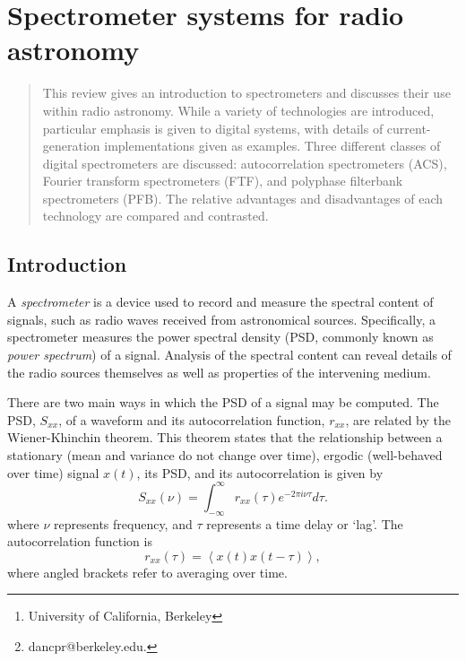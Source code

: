 \documentclass{ws-rv961x669}
\begin{document}
\chapter[Spectrometers]{Spectrometer systems for radio astronomy}\label{spec_chap}

\author[D. Price, J. Hickish and D. Werthimer]{Danny C. Price\footnote{dancpr@berkeley.edu.}, Jack Hickish and Dan Werthimer}

\address{Campbell Hall 339, UC Berkeley\\
Address goes here, \\
dancpr@berkeley.edu\footnote{University of California, Berkeley}}

\begin{abstract}
This review gives an introduction to spectrometers and discusses their use within radio astronomy. While a variety of technologies are introduced, particular emphasis is given to digital systems, with details of current-generation implementations given as examples. Three different classes of digital spectrometers are discussed: autocorrelation spectrometers (ACS), Fourier transform spectrometers (FTF), and polyphase filterbank spectrometers (PFB). The relative advantages and disadvantages of each technology are compared and contrasted. 

\end{abstract}


\body

\section{Introduction}\label{introduction}

A \emph{spectrometer} is a device used to record and measure the spectral content of signals, such as radio waves received from astronomical sources. Specifically, a spectrometer measures the power spectral density (PSD, commonly known as \emph{power spectrum}) of a signal.  Analysis of the spectral content can reveal details of the radio sources themselves as well as properties of the intervening medium.

There are two main ways in which the PSD of a signal may be computed. The PSD, $S_{xx}$, of a waveform and its autocorrelation function,  $r_{xx}$, are related by the Wiener-Khinchin theorem. This theorem states that the relationship between a stationary (mean and variance do not change over time), ergodic (well-behaved over time) signal $x(t)$, its PSD, and its autocorrelation is given by
\begin{equation}
S_{xx}(\nu)=\int_{-\infty}^{\infty}r_{xx}(\tau)e^{-2\pi i\nu\tau}d\tau.
\label{eq:psd}
\end{equation}
where $\nu$ represents frequency, and $\tau$ represents a time delay or `lag'. The autocorrelation function is
\begin{equation}
r_{xx}(\tau)=\left\langle x(t)x(t-\tau)\right\rangle,
\end{equation}
where angled brackets refer to averaging over time. 
\end{document}
